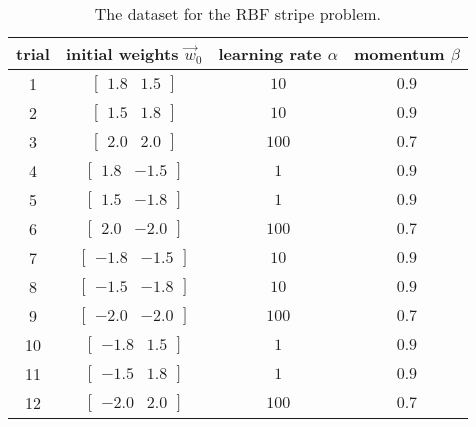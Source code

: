 \begin{table}[h!]
    \centering
    \begin{tabular}{c||c|c|c}
        trial & initial weights $\vec{w}_0$ & learning rate $\alpha$ & momentum $\beta$ \\
        \hline
        1  & $\begin{bmatrix} 1.8 &  1.5 \end{bmatrix}$ & $10 $ & $0.9$ \\
        2  & $\begin{bmatrix} 1.5 &  1.8 \end{bmatrix}$ & $10 $ & $0.9$ \\
        3  & $\begin{bmatrix} 2.0 &  2.0 \end{bmatrix}$ & $100$ & $0.7$ \\
        4  & $\begin{bmatrix} 1.8 & -1.5 \end{bmatrix}$ & $1  $ & $0.9$ \\
        5  & $\begin{bmatrix} 1.5 & -1.8 \end{bmatrix}$ & $1  $ & $0.9$ \\
        6  & $\begin{bmatrix} 2.0 & -2.0 \end{bmatrix}$ & $100$ & $0.7$ \\
        7  & $\begin{bmatrix}-1.8 & -1.5 \end{bmatrix}$ & $10 $ & $0.9$ \\
        8  & $\begin{bmatrix}-1.5 & -1.8 \end{bmatrix}$ & $10 $ & $0.9$ \\
        9  & $\begin{bmatrix}-2.0 & -2.0 \end{bmatrix}$ & $100$ & $0.7$ \\
        10 & $\begin{bmatrix}-1.8 &  1.5 \end{bmatrix}$ & $1  $ & $0.9$ \\
        11 & $\begin{bmatrix}-1.5 &  1.8 \end{bmatrix}$ & $1  $ & $0.9$ \\
        12 & $\begin{bmatrix}-2.0 &  2.0 \end{bmatrix}$ & $100$ & $0.7$
    \end{tabular}
    \caption{The dataset for the RBF stripe problem.}
    \label{table:stripe_gradient_descent_hyperparameters}
\end{table}
